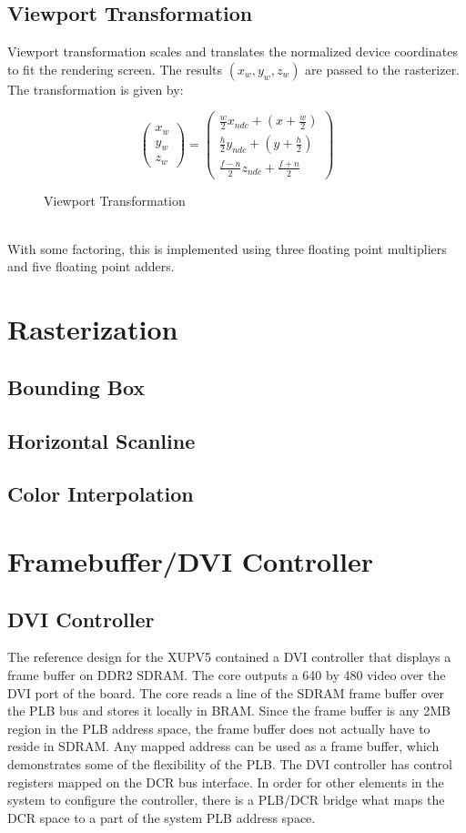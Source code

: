 \documentclass[letterpaper,10pt]{article}
\begin{document}
\subsection{Viewport Transformation}
Viewport transformation scales and translates the normalized device coordinates to fit the rendering screen. The results $(x_{w},y_{w},z_{w})$ are passed to the rasterizer. The transformation is given by: \\
\begin{figure}[h]
\[
\begin{pmatrix}
x_{w} \\
y_{w} \\
z_{w}
\end{pmatrix}
=
\begin{pmatrix}
\frac{w}{2}x_{ndc}+(x+\frac{w}{2}) \\
\frac{h}{2}y_{ndc}+(y+\frac{h}{2})  \\
\frac{f-n}{2}z_{ndc}+\frac{f+n}{2}
\end{pmatrix}
\]
\caption{Viewport Transformation}
\end{figure}\\
With some factoring, this is implemented using three floating point multipliers and five floating point adders.

\section{Rasterization}
\subsection{Bounding Box}
\subsection{Horizontal Scanline}
\subsection{Color Interpolation}

\section{Framebuffer/DVI Controller}

\subsection{DVI Controller}

The reference design for the XUPV5 contained a DVI controller that displays a frame buffer on DDR2 SDRAM.  The core outputs a 640 by 480 video over the DVI port of the board.  The core reads a line of the SDRAM frame buffer over the PLB bus and stores it locally in BRAM. Since the frame buffer is any 2MB region in the PLB address space, the frame buffer does not actually have to reside in SDRAM.  Any mapped address can be used as a frame buffer, which demonstrates some of the flexibility of the PLB.  The DVI controller has control registers mapped on the DCR bus interface.  In order for other elements in the system to configure the controller, there is a PLB/DCR bridge what maps the DCR space to a part of the system PLB address space.
\end{document}
